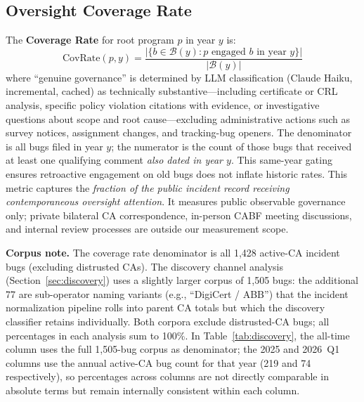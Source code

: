 \documentclass[10pt,twocolumn,letterpaper]{article}
\begin{document}
\subsection{Oversight Coverage Rate}
\label{sec:coveragerate_def}
The \textbf{Coverage Rate} for root program $p$ in year $y$ is:
\[
\text{CovRate}(p,y) = \frac{|\{b \in \mathcal{B}(y) : p \text{ engaged } b \text{ in year } y\}|}{|\mathcal{B}(y)|}
\]
where ``genuine governance'' is determined by LLM classification
(Claude Haiku, incremental, cached) as technically substantive---including
certificate or CRL analysis, specific policy violation citations with
evidence, or investigative questions about scope and root cause---excluding
administrative actions such as survey notices, assignment changes, and
tracking-bug openers. The denominator is all bugs filed in year $y$; the
numerator is the count of those bugs that received at least one qualifying
comment \textit{also dated in year $y$}. This same-year gating ensures
retroactive engagement on old bugs does not inflate historic rates.
This metric captures the \textit{fraction of the public incident record
receiving contemporaneous oversight attention}. It measures public observable
governance only; private bilateral CA correspondence, in-person CABF meeting
discussions, and internal review processes are outside our measurement scope.

\noindent\textbf{Corpus note.} The coverage rate denominator is all
1,428 active-CA incident bugs (excluding distrusted CAs). The discovery
channel analysis (Section~\ref{sec:discovery}) uses a slightly larger
corpus of 1,505 bugs: the additional 77 are sub-operator naming variants
(e.g., ``DigiCert / ABB'') that the incident normalization pipeline rolls
into parent CA totals but which the discovery classifier retains
individually. Both corpora exclude distrusted-CA bugs; all percentages
in each analysis sum to 100\%. In Table~\ref{tab:discovery}, the
all-time column uses the full 1,505-bug corpus as denominator; the
2025 and 2026~Q1 columns use the annual active-CA bug count for that
year (219 and 74 respectively), so percentages across columns are
not directly comparable in absolute terms but remain internally
consistent within each column.
\end{document}
